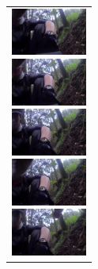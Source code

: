 \begin{enumerate}
\begin{end}
\begin{figure}[H]
\begin{tabular}{l}
      \begin{minipage}{0.165\hsize}
        \begin{center}
          \includegraphics[clip, width=2.5cm]{./Figures/still_seevictim1.eps}
        \end{center}
      \end{minipage}
      \begin{minipage}{0.165\hsize}
        \begin{center}
          \includegraphics[clip, width=2.5cm]{./Figures/still_seevictim2.eps}
        \end{center}
      \end{minipage}
      \begin{minipage}{0.165\hsize}
        \begin{center}
          \includegraphics[clip, width=2.5cm]{./Figures/still_seevictim3.eps}
        \end{center}
      \end{minipage}
      \begin{minipage}{0.165\hsize}
        \begin{center}
          \includegraphics[clip, width=2.5cm]{./Figures/still_seevictim4.eps}
        \end{center}
      \end{minipage}
      \begin{minipage}{0.165\hsize}
        \begin{center}
          \includegraphics[clip, width=2.5cm]{./Figures/still_seevictim5.eps}

\end{center}
\end{minipage}
\end{tabular}
\end{figure}
\end{end}
\end{enumerate}
